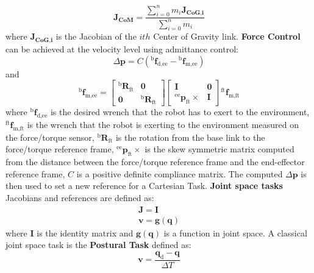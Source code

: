 \begin{equation}
\mathbf{J_\text{CoM}} = \frac{\sum_{i=0}^{n} m_i\mathbf{J_{\textbf{CoG,i}}}}{\sum_{i=0}^{n} m_i}
\end{equation}
where $\mathbf{J_{\textbf{CoG,i}}}$ is the Jacobian of the $ith$ Center of Gravity link.
\textbf{Force Control} can be achieved at the velocity level using admittance control:
\begin{equation}
\Delta\mathbf{p} = C \left({^\text{b}\mathbf{f}_\text{d,ee}} - {^\text{b}\mathbf{f}_\text{m,ee}} \right )
\end{equation}
and 
\begin{equation}
{^\text{b}\mathbf{f}_\text{m,ee}} = \begin{bmatrix}
{^\text{b}\mathbf{R}_\text{ft}} & \mathbf{0}\\ 
\mathbf{0} & {^\text{b}\mathbf{R}_\text{ft}} 
\end{bmatrix}
\begin{bmatrix}
\mathbf{I} & \mathbf{0}\\ 
{^\text{ee}\mathbf{p}_\text{ft}\times} & \mathbf{I} 
\end{bmatrix}{^\text{ft}\mathbf{f}_\text{m,ft}}
\end{equation}
where ${^\text{b}\mathbf{f}_\text{d,ee}}$ is the desired wrench that the robot has to exert to the environment, ${^\text{ft}\mathbf{f}_\text{m,ft}}$ is the wrench that the robot is exerting to the environment measured on the force/torque sensor, ${^\text{b}\mathbf{R}_\text{ft}}$ is the rotation from the base link to the force/torque reference frame, ${^\text{ee}\mathbf{p}_\text{ft}\times}$ is the skew symmetric matrix computed from the distance between the force/torque reference frame and the end-effector reference frame, $C$ is a positive definite compliance matrix. The computed $\Delta\mathbf{p}$ is then used to set a new reference for a Cartesian Task.
\textbf{Joint space tasks} Jacobians and references are defined as:
\begin{equation}
\begin{matrix}
\mathbf{J} = \mathbf{I} \\ 
\mathbf{v} = \mathbf{g(q)}
\end{matrix}
\end{equation}
where $\mathbf{I}$ is the identity matrix and $\mathbf{g(q)}$ is a function in joint space. A classical joint space task is the \textbf{Postural Task} defined as:
\begin{equation}
\mathbf{v} = \frac{\mathbf{q}_\text{d} - \mathbf{q}}{\Delta T}
\end{equation}
